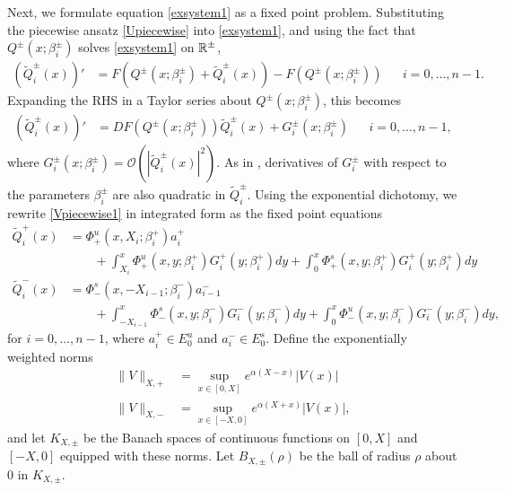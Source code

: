 \documentclass[12pt]{elsarticle}
\theoremstyle{plain}
\theoremstyle{definition}
\theoremstyle{remark}
\numberwithin{theorem}{section}
\numberwithin{equation}{section}
\begin{document}
Next, we formulate equation \cref{exsystem1} as a fixed point problem. Substituting the piecewise ansatz \cref{Upiecewise} into \cref{exsystem1}, and using the fact that $Q^\pm(x; \beta_i^\pm)$ solves \cref{exsystem1} on $\mathbb{R}^\pm$,
\begin{align*}
(\tilde{Q}_i^\pm(x))' &= F\left(Q^\pm(x; \beta_i^\pm) + \tilde{Q}_i^\pm(x) \right) - F(Q^\pm(x; \beta_i^\pm)) && i = 0, \dots, n-1.
\end{align*}
Expanding the RHS in a Taylor series about $Q^\pm(x; \beta_i^\pm)$, this becomes
\begin{align}\label{Vpiecewise1}
(\tilde{Q}_i^\pm(x))' &= DF(Q^\pm(x; \beta_i^\pm)) \tilde{Q}_i^\pm(x) + G_i^\pm(x; \beta_i^\pm) && i = 0, \dots, n-1,
\end{align}
where $G_i^\pm(x; \beta_i^\pm) = \mathcal{O}(|\tilde{Q}_i^\pm(x)|^2)$. As in \cite{Sandstede1997}, derivatives of $G_i^\pm$ with respect to the parameters $\beta_i^\pm$ are also quadratic in $\tilde{Q}_i^\pm$. Using the exponential dichotomy, we rewrite \cref{Vpiecewise1} in integrated form as the fixed point equations
\begin{equation}\label{FPequations}
\begin{aligned}
\tilde{Q}_i^+(x) &= \Phi^u_+(x, X_i; \beta_i^+) a_i^+ \\
&\qquad+ \int_{X_i}^x \Phi_+^u(x, y; \beta_i^+) G_i^+(y; \beta_i^+)dy 
+ \int_0^x \Phi_+^s(x, y; \beta_i^+) G_i^+(y; \beta_i^+)dy \\ 
\tilde{Q}_i^-(x) &= \Phi^s_-(x, -X_{i-1}; \beta_i^-) a_{i-1}^- \\ 
&\qquad+\int_{-X_{i-1}}^x \Phi_-^s(x, y; \beta_i^-) G_i^-(y; \beta_i^-)dy 
+ \int_0^x \Phi_-^u(x, y; \beta_i^-) G_i^-(y; \beta_i^-)dy,
\end{aligned}
\end{equation}
for $i = 0, \dots, n-1$, where $a_i^+ \in E_0^u$ and $a_i^- \in E_0^s$. Define the exponentially weighted norms
\begin{equation}\label{expwtnorm}
\begin{aligned}
\|V\|_{X, +} &= \sup_{x \in [0, X]} e^{\alpha(X - x)}|V(x)| \\
\|V\|_{X, -} &= \sup_{x \in [-X, 0]} e^{\alpha(X + x)}|V(x)|,
\end{aligned}
\end{equation}
and let $K_{X, \pm}$ be the Banach spaces of continuous functions on $[0, X]$ and $[-X, 0]$ equipped with these norms. Let $B_{X, \pm}(\rho)$ be the ball of radius $\rho$ about $0$ in $K_{X, \pm}$.
\end{document}
